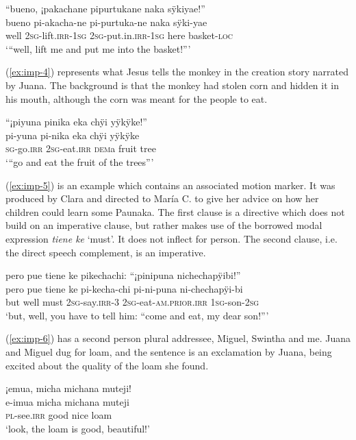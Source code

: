 \ea\label{ex:imp-3}
\begingl
\glpreamble “bueno, ¡pakachane pipurtukane naka sÿkiyae!”\\
\gla bueno pi-akacha-ne pi-purtuka-ne naka sÿki-yae\\
\glb well 2\textsc{sg}-lift.\textsc{irr}-1\textsc{sg} 2\textsc{sg}-put.in.\textsc{irr}-1\textsc{sg} here basket-\textsc{loc}\\
\glft ‘“well, lift me and put me into the basket!”’
\endgl
\trailingcitation{[mox-n110920l.118]}
\xe

(\ref{ex:imp-4}) represents what Jesus tells the monkey in the creation story narrated by Juana. The background is that the monkey had stolen corn and hidden it in his mouth, although the corn was meant for the people to eat.

\ea\label{ex:imp-4}
\begingl
\glpreamble “¡piyuna pinika eka chÿi yÿkÿke!”\\
\gla pi-yuna pi-nika eka chÿi yÿkÿke\\
\textsc{sg}-go.\textsc{irr} 2\textsc{sg}-eat.\textsc{irr} \textsc{dem}a fruit tree\\
\glft ‘“go and eat the fruit of the trees”’
\endgl
\trailingcitation{[jxx-n101013s-1.873]}
\xe

(\ref{ex:imp-5}) is an example which contains an associated motion marker. It was produced by Clara and directed to María C. to give her advice on how her children could learn some Paunaka. The first clause is a directive which does not build on an imperative clause, but rather makes use of the borrowed modal expression \textit{tiene ke} ‘must’. It does not inflect for person. The second clause, i.e. the direct speech complement, is an imperative.

\ea\label{ex:imp-5}
\begingl
\glpreamble pero pue tiene ke pikechachi: “¡pinipuna nichechapÿibi!”\\
\gla pero pue {tiene ke} pi-kecha-chi pi-ni-puna ni-chechapÿi-bi\\
\glb but well {must} 2\textsc{sg}-say.\textsc{irr}-3 2\textsc{sg}-eat-\textsc{am.prior.irr} 1\textsc{sg}-son-2\textsc{sg}\\
\glft ‘but, well, you have to tell him: “come and eat, my dear son!”’
\endgl
\trailingcitation{[cux-c120414ls-2.302]}
\xe

(\ref{ex:imp-6}) has a second person plural addressee, Miguel, Swintha and me. Juana and Miguel dug for loam, and the sentence is an exclamation by Juana, being excited about the quality of the loam she found.

\ea\label{ex:imp-6}
\begingl
\glpreamble ¡emua, micha michana muteji!\\
\gla e-imua micha michana muteji \\
\textsc{pl}-see.\textsc{irr} good nice loam \\
\glft ‘look, the loam is good, beautiful!’
\endgl
\trailingcitation{[jmx-d110918ls-1.089]}
\xe

